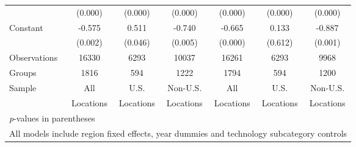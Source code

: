 \begin{table}[htbp]
\begin{tabular}{l*{6}{c}}
                &  (0.000)&  (0.000)&  (0.000)&  (0.000)&  (0.000)&  (0.000)\\
Constant        &   -0.575&    0.511&   -0.740&   -0.665&    0.133&   -0.887\\
                &  (0.002)&  (0.046)&  (0.005)&  (0.000)&  (0.612)&  (0.001)\\
\hline
Observations    &    16330&     6293&    10037&    16261&     6293&     9968\\
Groups          &     1816&      594&     1222&     1794&      594&     1200\\
Sample&All &U.S. &Non-U.S.&All &U.S. &Non-U.S. \\
          &Locations &Locations&Locations&Locations &Locations&Locations \\\hline\hline
\multicolumn{7}{l}{\footnotesize \textit{p}-values in parentheses}\\
\multicolumn{7}{l}{\footnotesize All models include region fixed effects, year dummies and technology subcategory controls}\\
\end{tabular}
\end{table}
